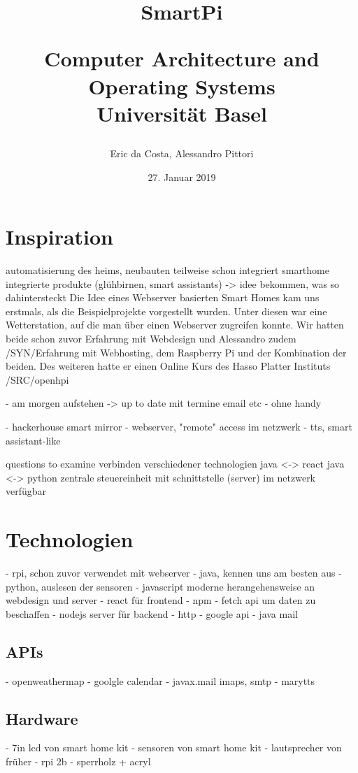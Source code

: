 \documentclass[11pt,a4paper]{article}
\title{SmartPi\\ \begin{large} Computer Architecture and Operating Systems\\ Universität Basel\end{large}}
\author{Eric da Costa, Alessandro Pittori}
\date{27. Januar 2019}
\begin{document}
\maketitle

\section{Inspiration}
automatisierung des heims, neubauten teilweise schon integriert
smarthome integrierte produkte (glühbirnen, smart assistants) -> idee bekommen, was so dahintersteckt
Die Idee eines Webserver basierten Smart Homes kam uns erstmals, als die Beispielprojekte vorgestellt wurden. Unter diesen war eine Wetterstation, auf die man über einen Webserver zugreifen konnte. Wir hatten beide schon zuvor Erfahrung mit Webdesign und Alessandro zudem /SYN/Erfahrung mit Webhosting, dem Raspberry Pi und der Kombination der beiden. Des weiteren hatte er einen Online Kurs des Hasso Platter Instituts /SRC/openhpi
\cite{smartmirror}

- am morgen aufstehen -> up to date mit termine email etc
- ohne handy

- hackerhouse smart mirror
- webserver, "remote" access im netzwerk
- tts, smart assistant-like

questions to examine
verbinden verschiedener technologien
java <-> react
java <-> python
zentrale steuereinheit mit schnittstelle (server) im netzwerk verfügbar


\section{Technologien}
- rpi, schon zuvor verwendet mit webserver
- java, kennen uns am besten aus
- python, auslesen der sensoren
- javascript
	moderne herangehensweise an webdesign und server
	- react für frontend
		- npm
		- fetch api um daten zu beschaffen
	- nodejs server für backend
- http
- google api
- java mail

\subsection{APIs}
- openweathermap
- goolgle calendar
- javax.mail imaps, smtp
- marytts
\subsection{Hardware}
- 7in lcd von smart home kit
- sensoren von smart home kit
- lautsprecher von früher
- rpi 2b
- sperrholz + acryl
\end{document}
